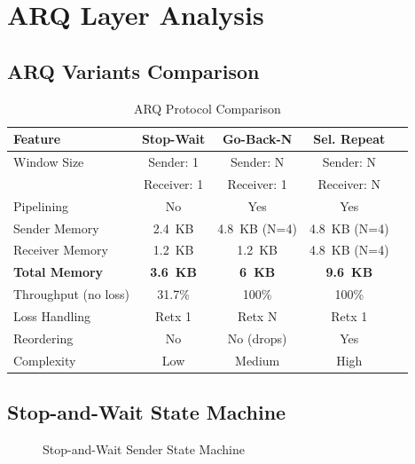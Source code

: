 \section{ARQ Layer Analysis}

\subsection{ARQ Variants Comparison}

\begin{table}[H]
\centering
\caption{ARQ Protocol Comparison}
\begin{tabular}{lcccc}
\toprule
\textbf{Feature} & \textbf{Stop-Wait} & \textbf{Go-Back-N} & \textbf{Sel. Repeat} \\
\midrule
Window Size & Sender: 1 & Sender: N & Sender: N \\
& Receiver: 1 & Receiver: 1 & Receiver: N \\
Pipelining & No & Yes & Yes \\
Sender Memory & 2.4~KB & 4.8~KB (N=4) & 4.8~KB (N=4) \\
Receiver Memory & 1.2~KB & 1.2~KB & 4.8~KB (N=4) \\
\textbf{Total Memory} & \textbf{3.6~KB} & \textbf{6~KB} & \textbf{9.6~KB} \\
Throughput (no loss) & 31.7\% & 100\% & 100\% \\
Loss Handling & Retx 1 & Retx N & Retx 1 \\
Reordering & No & No (drops) & Yes \\
Complexity & Low & Medium & High \\
\bottomrule
\end{tabular}
\end{table}

\subsection{Stop-and-Wait State Machine}

\begin{figure}[H]
\centering
{}
\caption{Stop-and-Wait Sender State Machine}
\end{figure}

